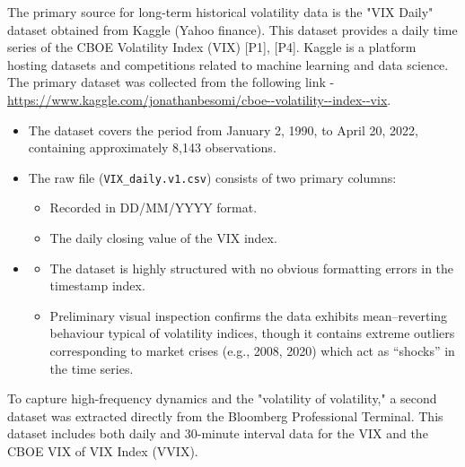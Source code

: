 \documentclass[12pt,a4paper]{report}
\numberwithin{equation}{section}
\begin{document}
The primary source for long-term historical volatility data is the "VIX Daily" dataset obtained from Kaggle (Yahoo finance). This dataset provides a daily time series of the CBOE Volatility Index (VIX) [P1], [P4]. Kaggle is a platform hosting datasets
and competitions related to machine learning and data science. The
primary dataset was collected from the following link -
\url{https://www.kaggle.com/jonathanbesomi/cboe--volatility--index--vix}.
\begin{itemize}
    \item {} The dataset covers the period from January 2, 1990, to April 20, 2022, containing approximately 8,143 observations.

    \item {} The raw file (\texttt{VIX\_daily.v1.csv}) consists of two primary columns:
    \begin{itemize}
        \item {} Recorded in DD/MM/YYYY format.
        \item {} The daily closing value of the VIX index.
    \end{itemize}

    \item {}
    \begin{itemize}
        \item {} The dataset is highly structured with no obvious formatting errors in the timestamp index.
        \item {} Preliminary visual inspection confirms the data exhibits mean--reverting behaviour typical of volatility indices, though it contains extreme outliers corresponding to market crises (e.g., 2008, 2020) which act as ``shocks'' in the time series.
    \end{itemize}
\end{itemize}

To capture high-frequency dynamics and the "volatility of volatility," a second dataset was extracted directly from the Bloomberg Professional Terminal. This dataset includes both daily and 30-minute interval data for the VIX and the CBOE VIX of VIX Index (VVIX).
\end{document}
